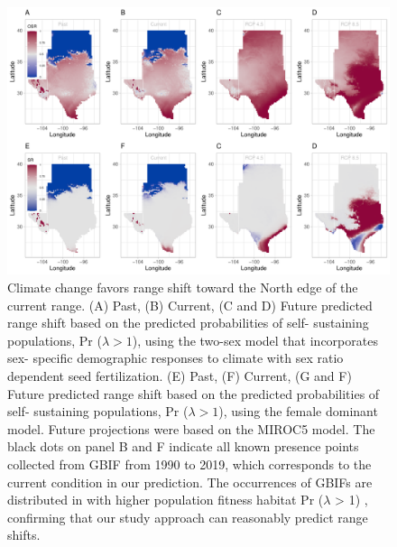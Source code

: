 \documentclass[12pt]{article}
\begin{document}
\begin{figure}[H]
  \begin{center}
    \includegraphics[width=0.99\linewidth]{Figures/Fig_geo_sr_miroc.pdf}
  \caption{Climate change favors range shift toward the North edge of the current range.
  (A) Past, (B) Current, (C and D) Future predicted range shift based on the predicted probabilities of self- sustaining populations, Pr ($\lambda > 1$), using the two-sex model that incorporates sex- specific demographic responses to climate with sex ratio dependent seed fertilization.
  (E) Past, (F) Current, (G and F) Future  predicted range shift based on the predicted probabilities of self- sustaining populations, Pr ($\lambda > 1$), using the female dominant model.
  Future projections were based on the MIROC5 model.
  The black dots on panel B and F indicate all known presence points collected from GBIF from 1990 to 2019, which corresponds to the current condition in our prediction. 
  The occurrences of GBIFs are distributed in with higher population fitness habitat Pr ($\lambda$ > 1) , confirming that our study approach can reasonably predict range shifts.}
  \label{Sup:srprojmiroc}
  \end{center}
\end{figure}
\end{document}
